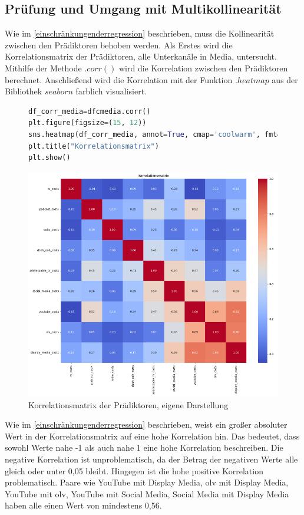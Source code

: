 \subsection{Prüfung und Umgang mit Multikollinearität}
\label{PrüfungUndUmgangMitMultikollinearität}
Wie im \autoref{einschränkungenderregression} beschrieben, muss die Kollinearität zwischen den Prädiktoren behoben werden. Als Erstes wird die Korrelationsmatrix der Prädiktoren, alle Unterkanäle in Media, untersucht. Mithilfe der Methode \(.corr()\) wird die Korrelation zwischen den Prädiktoren berechnet. Anschließend wird die Korrelation mit der Funktion \(.heatmap\) aus der Bibliothek \(seaborn\) farblich visualisiert.
\begin{figure}[H]
    \centering
    \begin{lstlisting}[language=Python, linewidth=\textwidth]
df_corr_media=dfcmedia.corr() 
plt.figure(figsize=(15, 12))
sns.heatmap(df_corr_media, annot=True, cmap='coolwarm', fmt=".2f")
plt.title("Korrelationsmatrix")
plt.show()
\end{lstlisting}
    \includegraphics[width=0.9\linewidth]{images/korrelationsmatrix.png}
    \caption{Korrelationsmatrix der Prädiktoren, eigene Darstellung}
    \label{fig:korrelationsmatrix}
\end{figure}
Wie im \autoref{einschränkungenderregression} beschrieben, weist ein großer absoluter Wert in der Korrelationsmatrix auf eine hohe Korrelation hin. Das bedeutet, dass sowohl Werte nahe -1 als auch nahe 1 eine hohe Korrelation beschreiben. Die negative Korrelation ist unproblematisch, da der Betrag der negativen Werte alle gleich oder unter 0,05 bleibt. Hingegen ist die hohe positive Korrelation problematisch. Paare wie YouTube mit Display Media, \ac{olv} mit Display Media, YouTube mit \ac{olv}, YouTube mit Social Media, Social Media mit Display Media haben alle einen Wert von mindestens 0,56. \par
